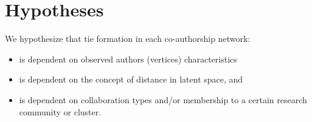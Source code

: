\section{Hypotheses}
\label{hypotheses}
We hypothesize that tie formation in each co-authorship network:
\begin{itemize}
\item is dependent on observed authors (vertices) characteristics
\item is dependent on the concept of distance in latent space, and
\item is dependent on collaboration types and/or membership to a certain research community or cluster.
\end{itemize}